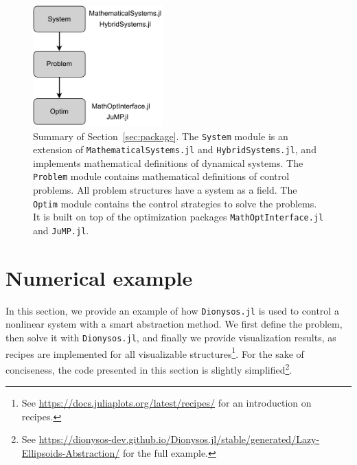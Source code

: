 \documentclass{juliacon}
\begin{document}
\begin{figure}[t]
    \centerline{\includegraphics[width=5cm]{Figures/Package/structure.pdf}}
    \caption{Summary of Section~\ref{sec:package}. The \texttt{System} module is an extension of \texttt{MathematicalSystems.jl} and \texttt{HybridSystems.jl}, and implements mathematical definitions of dynamical systems. The \texttt{Problem} module contains mathematical definitions of control problems. All problem structures have a system as a field. The \texttt{Optim} module contains the control strategies to solve the problems. It is built on top of the optimization packages \texttt{MathOptInterface.jl} and \texttt{JuMP.jl}.}
    \label{fig:structure}
\end{figure}


\section{Numerical example}
\label{sec:examples}

In this section, we provide an example of how \texttt{Dionysos.jl} is used to control a nonlinear system with a smart abstraction method. We first define the problem, then solve it with \texttt{Dionysos.jl}, and finally we provide visualization results, as recipes are implemented for all visualizable structures\footnote{See \url{https://docs.juliaplots.org/latest/recipes/} for an introduction on recipes.}. For the sake of conciseness, the code presented in this section is slightly simplified\footnote{See \url{https://dionysos-dev.github.io/Dionysos.jl/stable/generated/Lazy-Ellipsoids-Abstraction/} for the full example.}. 

\vskip 6pt
\end{document}
